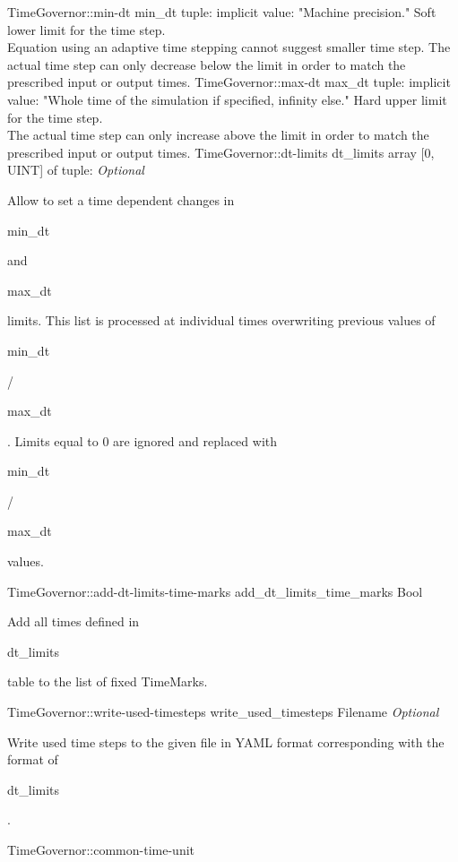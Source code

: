 \begin{RecordType}
{{}}
		\RecKey
			{TimeGovernor::min-dt}
			{min{\_}dt}
			{{tuple: }}{}
			{implicit value: "{Machine precision.}"}
			{{{Soft lower limit for the time step.}\\{
Equation using an adaptive time stepping cannot suggest smaller time step.
The actual time step can only decrease below the limit in order to match the prescribed input or output times.}%
}}
		\RecKey
			{TimeGovernor::max-dt}
			{max{\_}dt}
			{{tuple: }}{}
			{implicit value: "{Whole time of the simulation if specified, infinity else.}"}
			{{{Hard upper limit for the time step.}\\{
The actual time step can only increase above the limit in order to match the prescribed input or output times.}%
}}
		\RecKey
			{TimeGovernor::dt-limits}
			{dt{\_}limits}
			{{array [0, UINT] of }{tuple: }}{}
			{ \it{Optional}}
			{{{Allow to set a time dependent changes in }\begin{ttfamily}min{\_}dt\end{ttfamily}{ and }\begin{ttfamily}max{\_}dt\end{ttfamily}{ limits.
This list is processed at individual times overwriting previous values of }\begin{ttfamily}min{\_}dt\end{ttfamily}{/}\begin{ttfamily}max{\_}dt\end{ttfamily}{. Limits equal to 0 are ignored and replaced with }\begin{ttfamily}min{\_}dt\end{ttfamily}{/}\begin{ttfamily}max{\_}dt\end{ttfamily}{ values.}%
}}
		\RecKey
			{TimeGovernor::add-dt-limits-time-marks}
			{add{\_}dt{\_}limits{\_}time{\_}marks}
			{{Bool}}{}
			{ }
			{{{Add all times defined in }\begin{ttfamily}dt{\_}limits\end{ttfamily}{ table to the list of fixed TimeMarks.}%
}}
		\RecKey
			{TimeGovernor::write-used-timesteps}
			{write{\_}used{\_}timesteps}
			{{Filename}}{}
			{ \it{Optional}}
			{{{Write used time steps to the given file in YAML format corresponding with the format of }\begin{ttfamily}dt{\_}limits\end{ttfamily}{.}%
}}
		\RecKey
			{TimeGovernor::common-time-unit}

\end{RecordType}
